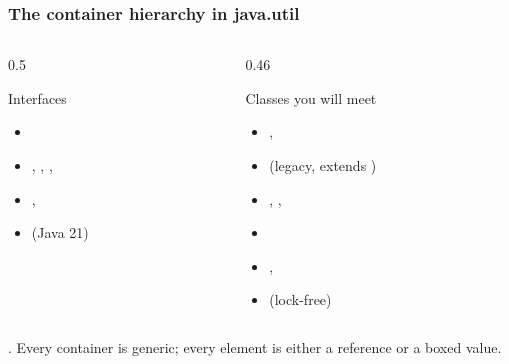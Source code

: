 \documentclass[aspectratio=169,10pt,compress]{beamer}
\begin{document}
\begin{frame}[t,fragile] \frametitle{The container hierarchy in java.util}
  \begin{columns}[T]
    \begin{column}{0.5\textwidth}
      \begin{block}{Interfaces}
        \small
        \begin{itemize}
          \item {}
          \item {}, , , 
          \item {}, 
          \item {} (Java 21)
        \end{itemize}
      \end{block}
    \end{column}
    \begin{column}{0.46\textwidth}
      \begin{block}{Classes you will meet}
        \small
        \begin{itemize}
          \item {}, 
          \item {} (legacy, extends )
          \item {}, , 
          \item {}
          \item {}, 
          \item {} (lock-free)
        \end{itemize}
      \end{block}
    \end{column}
  \end{columns}
  \vspace{0.3em}
  \small
  . Every container
  is generic; every element is either a reference or a boxed value.
\end{frame}

\end{document}
